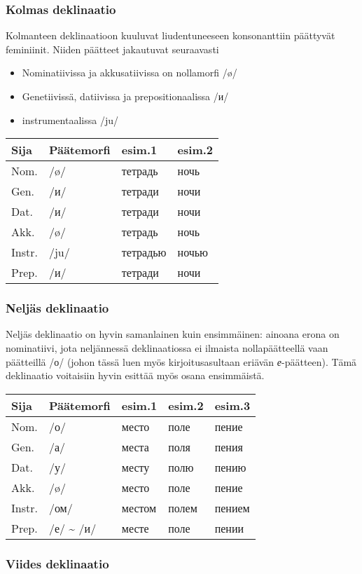 \documentclass[]{scrartcl}
\providecommand{\tightlist}{%
  \setlength{\itemsep}{0pt}\setlength{\parskip}{0pt}}
\begin{document}
\subsubsection{Kolmas deklinaatio}\label{kolmas-deklinaatio}

Kolmanteen deklinaatioon kuuluvat liudentuneeseen konsonanttiin
päättyvät feminiinit. Niiden päätteet jakautuvat seuraavasti

\begin{itemize}
\tightlist
\item
  Nominatiivissa ja akkusatiivissa on nollamorfi /ø/
\item
  Genetiivissä, datiivissa ja prepositionaalissa /и/
\item
  instrumentaalissa /ju/
\end{itemize}

\begin{longtable}[c]{@{}llll@{}}
\toprule
Sija & Päätemorfi & esim.1 & esim.2\tabularnewline
\midrule
\endhead
Nom. & /ø/ & тетрадь & ночь\tabularnewline
Gen. & /и/ & тетради & ночи\tabularnewline
Dat. & /и/ & тетради & ночи\tabularnewline
Akk. & /ø/ & тетрадь & ночь\tabularnewline
Instr. & /ju/ & тетрадью & ночью\tabularnewline
Prep. & /и/ & тетради & ночи\tabularnewline
\bottomrule
\end{longtable}

\subsubsection{Neljäs deklinaatio}\label{neljuxe4s-deklinaatio}

Neljäs deklinaatio on hyvin samanlainen kuin ensimmäinen: ainoana erona
on nominatiivi, jota neljännessä deklinaatiossa ei ilmaista
nollapäätteellä vaan päätteillä /о/ (johon tässä luen myös kirjoitusasultaan eriävän \emph{е}-päätteen). Tämä deklinaatio voitaisiin
hyvin esittää myös osana ensimmäistä.

\begin{longtable}[c]{@{}lllll@{}}
\toprule
Sija & Päätemorfi & esim.1 & esim.2 & esim.3\tabularnewline
\midrule
\endhead
Nom. & /о/ & место & поле & пение\tabularnewline
Gen. & /а/ & места & поля & пения\tabularnewline
Dat. & /у/ & месту & полю & пению\tabularnewline
Akk. & /ø/ & место & поле & пение\tabularnewline
Instr. & /ом/ & местом & полем & пением\tabularnewline
Prep. & /е/ \textasciitilde{} /и/ & месте & поле & пении\tabularnewline
\bottomrule
\end{longtable}

\subsubsection{Viides deklinaatio}\label{viides-deklinaatio}
\end{document}
